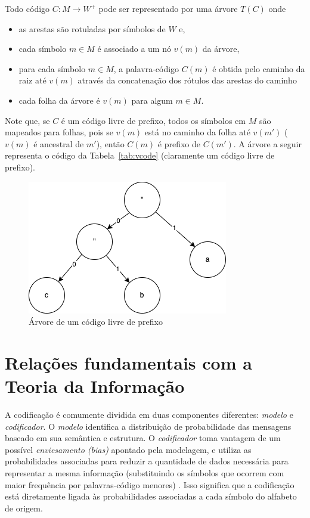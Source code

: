 Todo código $C\colon M\to W^+$ pode ser representado por uma árvore $T(C)$ onde \cite{Ble}
\begin{itemize}
\item as arestas são rotuladas por símbolos de $W$ e,
\item cada símbolo $m \in M$ é associado a um nó $v(m)$ da árvore,
\item para cada símbolo $m\in M$, a palavra-código $C(m)$ é obtida
  pelo caminho da raiz até $v(m)$ através da concatenação dos rótulos
  das arestas do caminho
\item cada folha da árvore é $v(m)$ para algum $m\in M$.
\end{itemize}
Note que, se $C$ é um código livre de prefixo, todos os símbolos em
$M$ são mapeados para folhas, pois se $v(m)$ está no caminho da folha
até $v(m')$ ($v(m)$ é ancestral de $m'$), então $C(m)$ é prefixo de
$C(m')$. A árvore a seguir representa o código da
Tabela~\ref{tab:vcode} (claramente um código livre de prefixo).

\begin{figure}[h]
   \centering
   \includegraphics[scale=0.75]{figs/prefixtree.png}
    \caption{Árvore de um código livre de prefixo}
    \label{fig:prefixt}
 \end{figure}
\section{Relações fundamentais com a Teoria da Informação}
A codificação é comumente dividida em duas componentes diferentes: \emph{modelo} e \emph{codificador}. 
O \emph{modelo} identifica a distribuição de probabilidade das mensagens baseado em sua semântica e estrutura. 
O \emph{codificador} toma vantagem de um possível \emph{enviesamento (bias)} apontado pela modelagem, e utiliza as probabilidades associadas para reduzir a quantidade de dados necessária para representar a mesma informação (substituindo os símbolos que ocorrem com maior frequência por palavras-código menores) \cite{HL}.
Isso significa que a codificação está diretamente ligada às probabilidades associadas a cada símbolo do alfabeto de origem.

